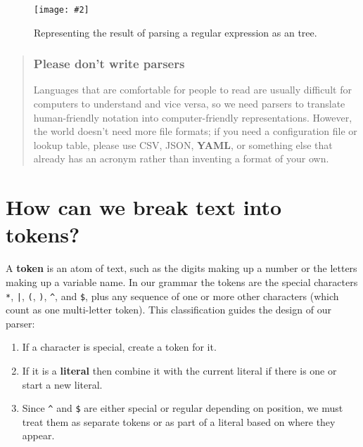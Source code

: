 \documentclass[krantzl]{krantz}
\newcommand{\figpdf}[4]{\begin{figure}%
\centering%
\texttt{[image: \#2]}%
\caption{#3}%
\label{#1}%
\end{figure}}
\newcommand{\glossref}[1]{\textbf{#1}}
\newenvironment{callout}{\savenotes\begin{tBox}\begin{quotation}\toggletrue{inbox}\renewcommand{\thempfootnote}{\arabic{footnote}}}{\end{quotation}\vspace{\baselineskip}\end{tBox}\togglefalse{inbox}\spewnotes}
\begin{document}
\figpdf{regex-parser-expression-tree}{./regex-parser/expression-tree.pdf}{Representing the result of parsing a regular expression as an tree.}{0.6}

\begin{callout}


\subsubsection*{Please don’t write parsers}


Languages that are comfortable for people to read are usually difficult for computers to understand
and vice versa,
so we need parsers to translate human-friendly notation into computer-friendly representations.
However,
the world doesn’t need more file formats;
if you need a configuration file or lookup table,
please use CSV, JSON, \glossref{YAML},
or something else that already has an acronym
rather than inventing a format of your own.

\end{callout}

\section{How can we break text into tokens?}\label{regex-parser-tokenize}


A \glossref{token} is an atom of text,
such as the digits making up a number or the letters making up a variable name.
In our grammar the tokens are the special characters \texttt{*}, \texttt{|}, \texttt{(}, \texttt{)}, \texttt{{\textasciicircum}}, and \texttt{\$},
plus any sequence of one or more other characters (which count as one multi-letter token).
This classification guides the design of our parser:

\begin{enumerate}

\item 

If a character is special, create a token for it.



\item 

If it is a \glossref{literal} then
    combine it with the current literal if there is one
    or start a new literal.



\item 

Since \texttt{{\textasciicircum}} and \texttt{\$} are either special or regular depending on position,
    we must treat them as separate tokens or as part of a literal
    based on where they appear.



\end{enumerate}
\end{document}
